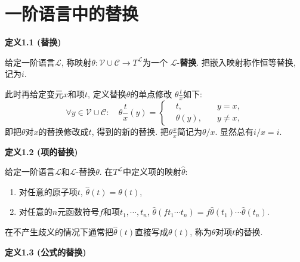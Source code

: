 


\setlength{\abovedisplayskip}{1pt}
\setlength{\belowdisplayskip}{1pt}

\section{一阶语言中的替换}

\hypertarget{sec:定义1.1}{}
\noindent\textbf{定义1.1 (替换)}

给定一阶语言$\mathcal{L}$,
称映射$\theta:\mathcal{V}\cup\mathcal{C}\to T^{\mathcal{L}}$为一个
$\mathcal{L}$-\textbf{替换}. 把嵌入映射称作恒等替换, 记为$i$.

\vspace{10pt}

此时再给定变元$x$和项$t$, 定义替换$\theta$的单点修改
$\displaystyle\theta\frac{t}{x}$如下:
\[\forall y\in\mathcal{V}\cup\mathcal{C}:\quad\theta\frac{t}{x}(y)=
\left\{\begin{aligned}
    &t,\quad&y=x,\\[-3pt]
    &\theta(y),\quad&y\neq x,
\end{aligned}\right.\]
即把$\theta$对$x$的替换修改成$t$, 得到的新的替换.
把$\displaystyle\theta\frac{x}{x}$简记为$\theta/x$. 显然总有$i/x=i$.

\vspace{10pt}

\hypertarget{sec:定义1.2}{}
\noindent\textbf{定义1.2 (项的替换)}

给定一阶语言$\mathcal{L}$和$\mathcal{L}$-替换$\theta$.
在$T^{\mathcal{L}}$中定义项的映射$\widehat{\theta}$:
\begin{enumerate}
    \item 对任意的原子项$t$, $\widehat{\theta}(t)=\theta(t)$,
    \item 对任意的$n$元函数符号$f$和项$t_1,\cdots,t_n$,
    $\widehat{\theta}(ft_1\cdots t_n)=f\widehat{\theta}(t_1)\cdots
    \widehat{\theta}(t_n)$.
\end{enumerate}
在不产生歧义的情况下通常把$\widehat{\theta}(t)$直接写成$\theta(t)$, 称为$\theta$对项$t$的替换.

\vspace{10pt}

\hypertarget{sec:定义1.3}{}
\noindent\textbf{定义1.3 (公式的替换)}

